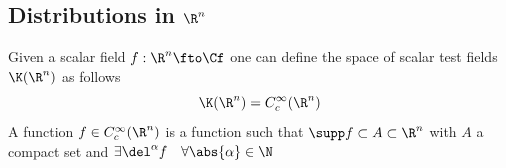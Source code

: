 \documentclass[../mmf.tex]{subfiles}
\begin{document}
\subsection{Distributions in $\R^n$}
\begin{dfn}
	Given a scalar field $f:\R^n\fto\Cf$ one can define the space of scalar test fields $\K(\R^n)$ as follows
	\begin{equation}
		\K(\R^n)=C_c^\infty(\R^n)
		\label{eq:scalartestfields}
	\end{equation}
	A function $f\in C_c^\infty(\R^n)$ is a function such that $\supp f\subset A\subset\R^n$ with $A$ a compact set and $\exists\del^\alpha f\quad\forall\abs{\alpha}\in\N$
\end{dfn}
\end{document}
